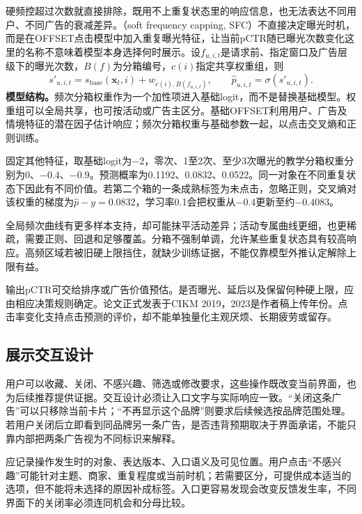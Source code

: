 硬频控超过次数就直接排除，既用不上重复状态里的响应信息，也无法表达不同用户、不同广告的衰减差异。（soft frequency capping, SFC）不直接决定曝光时机，而是在OFFSET点击模型中加入重复曝光特征，让当前pCTR随已曝光次数变化这里的名称不意味着模型本身选择何时展示。设$f_{u,i,t}$是请求前、指定窗口及广告层级下的曝光次数，$B(f)$为分箱编号，$c(i)$指定共享权重组，则
\begin{equation}
 s'_{u,i,t}=s_{\mathrm{base}}(\bm x_t,i)+w_{c(i),B(f_{u,i,t})},
 \qquad
 \widehat p_{u,i,t}=\sigma(s'_{u,i,t}).
 \label{eq:rs-sfc}
\end{equation}
\textbf{模型结构。}频次分箱权重作为一个加性项进入基础logit，而不是替换基础模型。权重组可以全局共享，也可按活动或广告主区分。基础OFFSET利用用户、广告及情境特征的潜在因子估计响应；频次分箱权重与基础参数一起，以点击交叉熵和正则训练。

固定其他特征，取基础logit为$-2$，零次、1至2次、至少3次曝光的教学分箱权重分别为0、$-0.4$、$-0.9$。预测概率为0.1192、0.0832、0.0522。同一对象在不同重复状态下因此有不同价值。若第二个箱的一条成熟标签为未点击，忽略正则，交叉熵对该权重的梯度为$\widehat p-y=0.0832$，学习率0.1会把权重从$-0.4$更新至约$-0.4083$。

全局频次曲线有更多样本支持，却可能抹平活动差异；活动专属曲线更细，也更稀疏，需要正则、回退和足够覆盖。分箱不强制单调，允许某些重复状态具有较高响应。高频区域若被旧硬上限挡住，就缺少训练证据，不能仅靠模型外推认定解除上限有益。

输出pCTR可交给排序或广告价值预估。是否曝光、延后以及保留何种硬上限，应由相应决策规则确定。论文正式发表于CIKM 2019，2023是作者稿上传年份。点击率变化支持点击预测的评价，却不能单独量化主观厌烦、长期疲劳或留存。

\subsection{展示交互设计}
\label{sec:rs-presentation-interaction}

用户可以收藏、关闭、不感兴趣、筛选或修改要求，这些操作既改变当前界面，也为后续推荐提供证据。交互设计必须让入口文字与实际响应一致。“关闭这条广告”可以只移除当前卡片；“不再显示这个品牌”则要求后续候选按品牌范围处理。若用户关闭后立即看到同品牌另一条广告，是否违背预期取决于界面承诺，不能只靠内部把两条广告视为不同标识来解释。

应记录操作发生时的对象、表达版本、入口语义及可见位置。用户点击“不感兴趣”可能针对主题、商家、重复程度或当前时机；若需要区分，可提供成本适当的选项，但不能将未选择的原因补成标签。入口更容易发现会改变反馈发生率，不同界面下的关闭率必须连同机会和分母比较。

